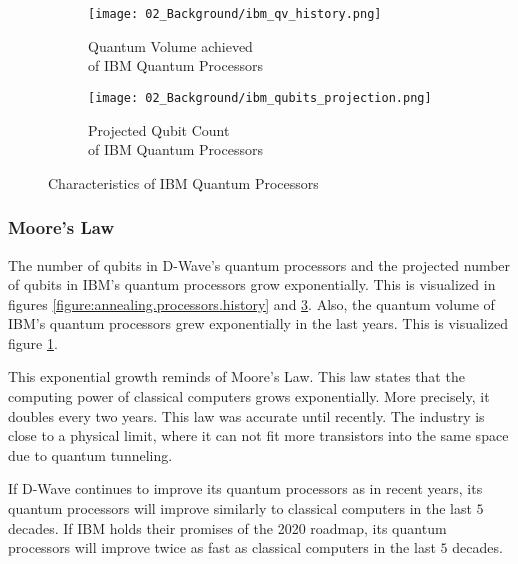 \begin{figure}[!ht]
  \begin{subfigure}[b]{0.5 \textwidth}
    \centering
    \texttt{[image: 02\_Background/ibm\_qv\_history.png]}
    \caption{Quantum Volume achieved\\ of IBM Quantum Processors \cite{IBMqv2020}}
    \label{figure:gate.qv.history}
  \end{subfigure}
  \begin{subfigure}[b]{0.5 \textwidth}
    \centering
    \texttt{[image: 02\_Background/ibm\_qubits\_projection.png]}
    \caption{Projected Qubit Count\\ of IBM Quantum Processors \cite{IBMRoadmap2020}}
    \label{figure:gate.qbits.projection}
  \end{subfigure}
  \caption{Characteristics of IBM Quantum Processors}
\end{figure}

\subsubsection{Moore's Law}

The number of qubits in D-Wave's quantum processors and the projected number of qubits in IBM's quantum processors grow exponentially.
This is visualized in figures \ref{figure:annealing.processors.history} and \ref{figure:gate.qbits.projection}.
Also, the quantum volume of IBM's quantum processors grew exponentially in the last years.
This is visualized figure \ref{figure:gate.qv.history}.

This exponential growth reminds of Moore's Law.
This law states that the computing power of classical computers grows exponentially.
More precisely, it doubles every two years.
This law was accurate until recently.
The industry is close to a physical limit, where it can not fit more transistors into the same space due to quantum tunneling.
\cite{Theis2017, Ferain2011}

If D-Wave continues to improve its quantum processors as in recent years, its quantum processors will improve similarly to classical computers in the last $5$ decades.
If IBM holds their promises of the 2020 roadmap, its quantum processors will improve twice as fast as classical computers in the last $5$ decades.
